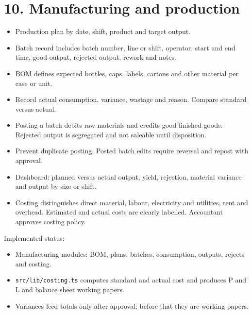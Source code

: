 \documentclass[11pt]{article}
\begin{document}
\section{10. Manufacturing and production}
\begin{itemize}[leftmargin=*,itemsep=2pt,topsep=2pt]
\item Production plan by date, shift, product and target output.
\item Batch record includes batch number, line or shift, operator, start and end time, good output, rejected output, rework and notes.
\item BOM defines expected bottles, caps, labels, cartons and other material per case or unit.
\item Record actual consumption, variance, wastage and reason. Compare standard versus actual.
\item Posting a batch debits raw materials and credits good finished goods. Rejected output is segregated and not saleable until disposition.
\item Prevent duplicate posting. Posted batch edits require reversal and repost with approval.
\item Dashboard: planned versus actual output, yield, rejection, material variance and output by size or shift.
\item Costing distinguishes direct material, labour, electricity and utilities, rent and overhead. Estimated and actual costs are clearly labelled. Accountant approves costing policy.
\end{itemize}
Implemented status:
\begin{itemize}[leftmargin=*,itemsep=2pt,topsep=2pt]
\item Manufacturing modules: BOM, plans, batches, consumption, outputs, rejects and costing.
\item \texttt{src/lib/costing.ts} computes standard and actual cost and produces P and L and balance sheet working papers.
\item Variances feed totals only after approval; before that they are working papers.
\end{itemize}
\clearpage
\end{document}
